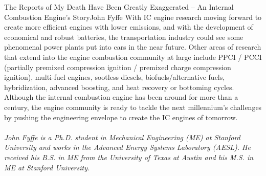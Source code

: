 \documentclass[10pt]{papertex}
\begin{document}
\begin{news}{2}{The Reports of My Death Have Been Greatly Exaggerated -- An Internal Combustion Engine’s Story}{John Fyffe}{}{}
With IC engine research moving forward to create more efficient engines with 
lower emissions, and with the development of economical and robust batteries, 
the transportation industry could see some phenomenal power plants put into 
cars in the near future.  Other areas of research that extend into the engine 
combustion community at large include PPCI / PCCI (partially premixed 
compression ignition / premixed charge compression ignition), multi-fuel 
engines, sootless diesels, biofuels/alternative fuels, hybridization, advanced 
boosting, and heat recovery or bottoming cycles.  Although the internal 
combustion engine has been around for more than a century, the engine 
community is ready to tackle the next millennium’s challenges by pushing the 
engineering envelope to create the IC engines of tomorrow.
\\
\\

\emph{John Fyffe is a Ph.D. student in Mechanical Engineering (ME) at Stanford 
University and works in the Advanced Energy Systems Laboratory (AESL). He 
received his B.S. in ME from the University of Texas at Austin and his M.S. 
in ME at Stanford University.}

\end{news}
\end{document}
